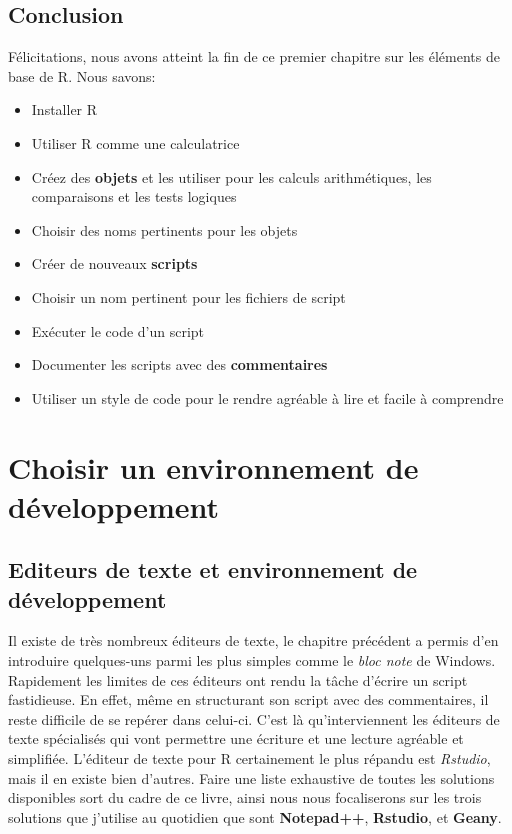 \documentclass[
]{book}
\providecommand{\tightlist}{%
  \setlength{\itemsep}{0pt}\setlength{\parskip}{0pt}}
\begin{document}
\hypertarget{conclusion}{%
\section{Conclusion}\label{conclusion}}

Félicitations, nous avons atteint la fin de ce premier chapitre sur les éléments de base de R. Nous savons:

\begin{itemize}
\tightlist
\item
  Installer R
\item
  Utiliser R comme une calculatrice
\item
  Créez des \textbf{objets} et les utiliser pour les calculs arithmétiques, les comparaisons et les tests logiques
\item
  Choisir des noms pertinents pour les objets
\item
  Créer de nouveaux \textbf{scripts}
\item
  Choisir un nom pertinent pour les fichiers de script
\item
  Exécuter le code d'un script
\item
  Documenter les scripts avec des \textbf{commentaires}
\item
  Utiliser un style de code pour le rendre agréable à lire et facile à comprendre
\end{itemize}

\hypertarget{IDE}{%
\chapter{Choisir un environnement de développement}\label{IDE}}

\hypertarget{editeurs-de-texte-et-environnement-de-duxe9veloppement}{%
\section{Editeurs de texte et environnement de développement}\label{editeurs-de-texte-et-environnement-de-duxe9veloppement}}

Il existe de très nombreux éditeurs de texte, le chapitre précédent a permis d'en introduire quelques-uns parmi les plus simples comme le \emph{bloc note} de Windows. Rapidement les limites de ces éditeurs ont rendu la tâche d'écrire un script fastidieuse. En effet, même en structurant son script avec des commentaires, il reste difficile de se repérer dans celui-ci. C'est là qu'interviennent les éditeurs de texte spécialisés qui vont permettre une écriture et une lecture agréable et simplifiée.
L'éditeur de texte pour R certainement le plus répandu est \emph{Rstudio}, mais il en existe bien d'autres. Faire une liste exhaustive de toutes les solutions disponibles sort du cadre de ce livre, ainsi nous nous focaliserons sur les trois solutions que j'utilise au quotidien que sont \textbf{Notepad++}, \textbf{Rstudio}, et \textbf{Geany}.
\end{document}
